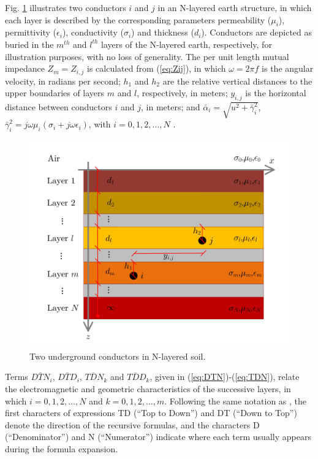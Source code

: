 \documentclass{IEEEtran4PSCC}
\begin{document}
Fig. \ref{fig:NlayeredSoil} illustrates two conductors $i$ and $j$ in an N-layered earth structure, in which each layer is described by the corresponding parameters permeability ($\mu_{i}$), permittivity ($\epsilon_{i}$), conductivity ($\sigma_{i}$) and thickness ($d_{i}$). Conductors are depicted as buried in the $m^{th}$ and $l^{th}$ layers of the N-layered earth, respectively, for illustration purposes, with no loss of generality. The per unit length mutual impedance $Z_m=Z_{i,j}$ is calculated from (\ref{eq:Zij}), in which $\omega = 2\pi f$ is the angular velocity, in radians per second; $h_{1}$ and $h_{2}$ are the relative vertical distances to the upper boundaries of layers $m$ and $l$, respectively, in meters; $y_{i,j}$ is the horizontal distance between  conductors $i$ and $j$, in meters; and $\bar{\alpha}_{i} = \sqrt{u^2 + \bar{\gamma}_{i}^{2}}$, $\bar{\gamma}_{i}^{2} = j\omega\mu_{i}(\sigma_{i} + j\omega\epsilon_{i})$, with $i = 0,1,2,\dots,N$ \cite{Tsiamitros2008a}.

\begin{figure}[hbt]
	\begin{center}
		\includegraphics[width=1\columnwidth]{./fig/multilayered_soil2.pdf}
		\caption{Two underground conductors in N-layered soil.}
		\label{fig:NlayeredSoil}
	\end{center}
\end{figure}

Terms $D\bar{T}N_{i}$, $D\bar{T}D_{i}$, $T\bar{D}N_{k}$ and $T\bar{D}D_{k}$, given in (\ref{eq:DTN})-(\ref{eq:TDN}), relate the electromagnetic and geometric characteristics of the successive layers, in which $i = 0,1,2,\dots,N$ and $k = 0,1,2,\dots,m$. Following the same notation as \cite{Tsiamitros2008a}, the first characters of expressions TD (``Top to Down'') and DT (``Down to Top'') denote the direction of the recursive formulas, and the characters D (``Denominator'') and N (``Numerator'') indicate where each term usually appears during the formula expansion.
\end{document}
